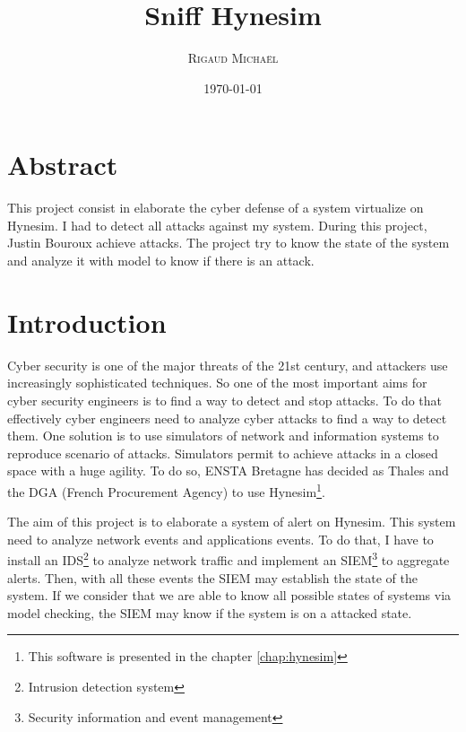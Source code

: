 \documentclass[a4paper, 11pt, oneside, oldfontcommands]{memoir}
\title{Sniff Hynesim}
\author{\textsc{Rigaud Michaël}}
\date{\today}
\newcounter{rem}[chapter]
\newcounter{th}[chapter]
\begin{document}
\maketitle
\thispagestyle{empty}
\newpage

\tableofcontents



\chapter*{Abstract}


This project consist in elaborate the cyber defense of a system virtualize on Hynesim. I had to detect all attacks
against my system. During this project, Justin Bouroux achieve attacks. The project try to know the state of the
system and analyze it with model to know if there is an attack.



\chapter*{Introduction}

Cyber security is one of the major threats of the 21st century, and attackers use increasingly sophisticated
techniques. So one of the most important aims for cyber security engineers is to find a way to detect and stop
attacks. To do that effectively cyber engineers need to analyze cyber attacks to find a way to detect them. One
solution is to use simulators of network and information systems to reproduce scenario of attacks. Simulators
permit to achieve attacks in a closed space with a huge agility. To do so, ENSTA Bretagne has decided as Thales and
the DGA (French Procurement Agency) to use Hynesim\footnote{This software is presented in the chapter
  \ref{chap:hynesim}}.

The aim of this project is to elaborate a system of alert on Hynesim. This system need to analyze network events
and applications events. To do that, I have to install an IDS\footnote{Intrusion detection system} to analyze
network traffic and implement an SIEM\footnote{Security information and event management} to aggregate alerts.
Then, with all these events the SIEM may establish the state of the system. If we consider that we are able to know
all possible states of systems via model checking, the SIEM may know if the system is on a attacked state.
\end{document}
